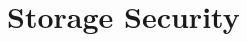 \documentclass{sig-alternate}
\begin{document}



\section{Storage Security}
\label{sec:fs}

\end{document}
